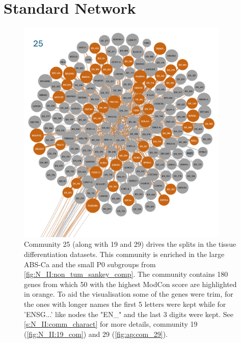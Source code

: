 \section{Standard Network} \label{ap:N_II:coms}

\begin{figure}[H]    
    \centering
    \includegraphics[width=0.9\textwidth,keepaspectratio]{Sections/Network_II/resources/non_tum/25_com.png}
    \caption[Community 25 - driving the healthy and tumour splits]{Community 25 (along with 19 and 29) drives the splits in the tissue differentiation datasets. This community is enriched in the large ABS-Ca and the small P0 subgroups from \cref{fig:N_II:non_tum_sankey_comp}. The community contains 180 genes from which 50 with the highest ModCon score are highlighted in orange. To aid the visualisation some of the genes were trim, for the ones with longer names the first 5 letters were kept while for 'ENSG...' like nodes the "EN\_" and the last 3 digits were kept. See \cref{s:N_II:comm_charact} for more details, community 19 (\cref{fig:N_II:19_com}) and 29 (\cref{fig:ap:com_29}). }
    \label{fig:ap:com_25}
\end{figure}

